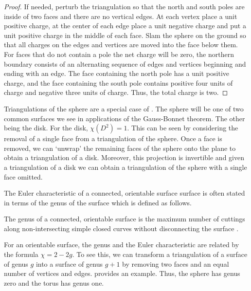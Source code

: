 \begin{proof}
If needed, perturb the triangulation so that the north and south poles are 
inside of  two faces and there are no vertical edges. At each vertex place a unit positive
charge, at the center of each edge place a unit negative charge and put a unit positive
charge in the middle of each face. Slam the sphere on the ground so that all charges
on the edges and vertices are moved into the face below them. For faces that do not contain a pole
the net charge will be zero, the northern boundary consists of an alternating sequence
of edges and vertices  beginning  and ending with an edge.
The face containing the north pole has a unit positive charge, and the face containing the south
pole contains positive four units of charge and negative three units of charge.
Thus, the total charge is two.

\end{proof}

Triangulations of the sphere are a special case of .
The sphere will be one of two common surfaces we see in applications
of the Gauss-Bonnet theorem. The other being the disk.
For the disk, $\chi(D^2)=1$. This can be seen by considering
the removal of a single face from a triangulation of the sphere.
Once a face is removed, we can `unwrap' the remaining faces of the sphere
onto the plane to obtain a triangulation of a disk. Moreover, this projection
is invertible and given a triangulation of a disk we can obtain a triangulation
of the sphere with a single face omitted.

The Euler characteristic of a connected, orientable surface surface is often 
stated in terms of the genus of the surface which is defined as follows.
\begin{definition}\label{def:genus}
	The genus of a connected, orientable surface is the maximum number of
	cuttings along non-intersecting simple closed curves without disconnecting
	the surface \cite{munkres}.
\end{definition}


For an orientable surface, the genus and the Euler characteristic are related by
the formula $\chi=2-2g$. To see this, we can transform a triangulation of a surface of
genus $g$ into a surface of genus $g+1$ by removing two faces and an equal number
of vertices and edges.  provides an example.
Thus, the sphere has genus zero and the torus has genus one.


